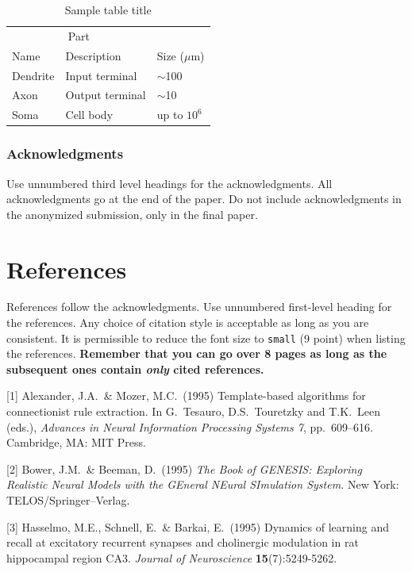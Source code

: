 \documentclass{article}
\begin{document}
\begin{table}[t]
  \caption{Sample table title}
  \label{sample-table}
  \centering
  \begin{tabular}{lll}
    \toprule
    \multicolumn{2}{c}{Part}                   \\
    \cmidrule{1-2}
    Name     & Description     & Size ($\mu$m) \\
    \midrule
    Dendrite & Input terminal  & $\sim$100     \\
    Axon     & Output terminal & $\sim$10      \\
    Soma     & Cell body       & up to $10^6$  \\
    \bottomrule
  \end{tabular}
\end{table}


\subsubsection*{Acknowledgments}

Use unnumbered third level headings for the acknowledgments. All
acknowledgments go at the end of the paper. Do not include
acknowledgments in the anonymized submission, only in the final paper.

\section*{References}

References follow the acknowledgments. Use unnumbered first-level
heading for the references. Any choice of citation style is acceptable
as long as you are consistent. It is permissible to reduce the font
size to \verb+small+ (9 point) when listing the references. {\bf
  Remember that you can go over 8 pages as long as the subsequent ones contain
  \emph{only} cited references.}
\medskip

\small

[1] Alexander, J.A.\ \& Mozer, M.C.\ (1995) Template-based algorithms
for connectionist rule extraction. In G.\ Tesauro, D.S.\ Touretzky and
T.K.\ Leen (eds.), {\it Advances in Neural Information Processing
  Systems 7}, pp.\ 609--616. Cambridge, MA: MIT Press.

[2] Bower, J.M.\ \& Beeman, D.\ (1995) {\it The Book of GENESIS:
  Exploring Realistic Neural Models with the GEneral NEural SImulation
  System.}  New York: TELOS/Springer--Verlag.

[3] Hasselmo, M.E., Schnell, E.\ \& Barkai, E.\ (1995) Dynamics of
learning and recall at excitatory recurrent synapses and cholinergic
modulation in rat hippocampal region CA3. {\it Journal of
  Neuroscience} {\bf 15}(7):5249-5262.
  
\end{document}
